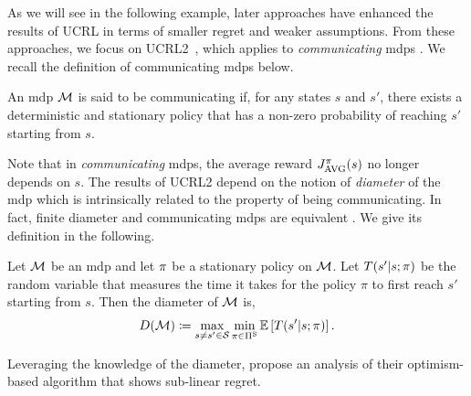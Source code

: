 As we will see in the following example, later approaches have enhanced the results of UCRL in terms of smaller regret and weaker assumptions.
From these approaches, we focus on UCRL2~\cite{auer2008near}, which applies to \emph{communicating} \glspl{mdp} \cite[Section~8.3.1]{puterman1994markov}.  
We recall the definition of communicating \glspl{mdp} below.

\begin{defi}
\label{def:communicating_mdp}
    An \gls{mdp} $\mathcal{M}$ is said to be communicating if, for any states $s$ and $s'$, there exists a deterministic and stationary policy that has a non-zero probability of reaching $s'$ starting from $s$.
\end{defi}

Note that in \emph{communicating} \glspl{mdp}, the average reward $\averagereturnfunction(s)$ no longer depends on $s$.
The results of UCRL2 depend on the notion of \emph{diameter} of the \gls{mdp} which is intrinsically related to the property of being communicating. 
In fact, finite diameter and communicating \glspl{mdp} are equivalent \cite{auer2008near}. We give its definition in the following.

\begin{defi}
\label{def:diameter}
    Let $\mathcal{M}$ be an \gls{mdp} and let $\pi$ be a stationary policy on $\mathcal{M}$. 
    Let $T(s'\vert s;\pi)$ be the random variable that measures the time it takes for the policy $\pi$ to first reach $s'$ starting from $s$. 
    Then the diameter of $\mathcal{M}$ is,
    \begin{align*}
        D(\mathcal{M}) \coloneq \max_{s\neq s'\in\mathcal{S}}\min_{\pi\in\Pi^{\text{S}}} \operatorname*{\mathbb{E}}\left[T(s'\vert s;\pi)\right].
    \end{align*}
\end{defi}

Leveraging the knowledge of the diameter, \cite{auer2008near} propose an analysis of their optimism-based algorithm that shows sub-linear regret. 
